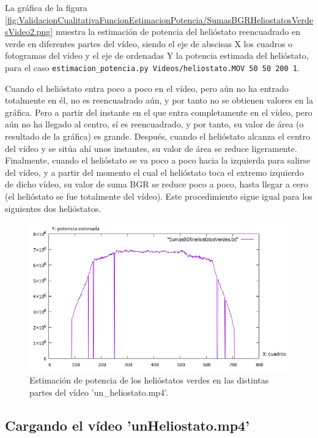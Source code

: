 La gráfica de la figura \ref{fig:ValidacionCualitativaFuncionEstimacionPotencia/SumasBGRHeliostatosVerdesVideo2.png} muestra la estimación de potencia del helióstato reencuadrado en verde en diferentes partes del vídeo, siendo el eje de abscisas X los cuadros o fotogramas del vídeo y el eje de ordenadas Y la potencia estimada del helióstato, para el caso \verb|estimacion_potencia.py Videos/heliostato.MOV 50 50 200 1|.

Cuando el helióstato entra poco a poco en el vídeo, pero aún no ha entrado totalmente en él, no es reencuadrado aún, y por tanto no se obtienen valores en la gráfica. Pero a partir del instante en el que entra completamente en el vídeo, pero aún no ha llegado al centro, sí es reencuadrado, y por tanto, su valor de área (o resultado de la gráfica) es grande. Después, cuando el helióstato alcanza el centro del vídeo y se sitúa ahí unos instantes, su valor de área se reduce ligeramente. Finalmente, cuando el helióstato se va poco a poco hacia la izquierda para salirse del vídeo, y a partir del momento el cual el helióstato toca el extremo izquierdo de dicho vídeo, su valor de suma BGR se reduce poco a poco, hasta llegar a cero (el helióstato se fue totalmente del vídeo). Este procedimiento sigue igual para los siguientes dos helióstatos.

\begin{figure}[h!]
  	\centering
	\includegraphics[width=\textwidth]{ValidacionCualitativaFuncionEstimacionPotencia/SumasBGRHeliostatosVerdesVideo3.png}
	\caption{Estimación de potencia de los helióstatos verdes en las distintas partes del vídeo 'un\_heliostato.mp4'.
	\label{fig:ValidacionCualitativaFuncionEstimacionPotencia/SumasBGRHeliostatosVerdesVideo3.png}}
\end{figure}

\subsection{Cargando el vídeo 'unHeliostato.mp4'}

